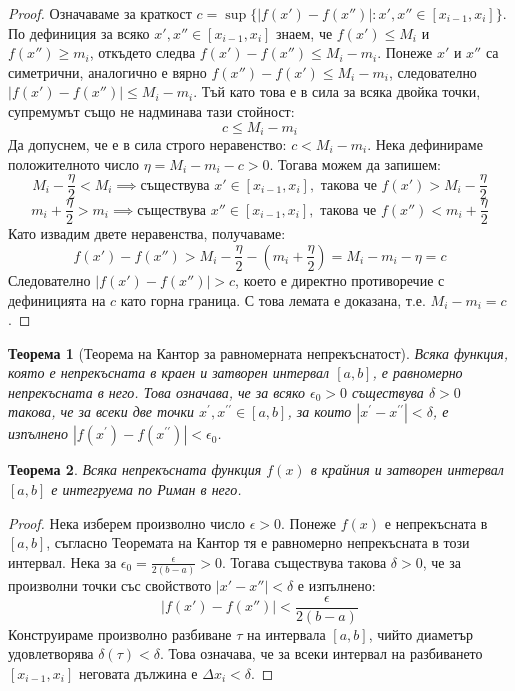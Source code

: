 \documentclass{scrartcl}
\newtheorem{theorem}{Теорема}
\begin{document}
\begin{FlushLeft}
\begin{proof}
Означаваме за краткост $c = \sup \{ |f(x') - f(x'')| : x', x'' \in [x_{i-1}, x_i] \}$.
По дефиниция за всяко $x', x'' \in [x_{i-1}, x_i]$ знаем, че $f(x') \le M_i$ и $f(x'') \ge m_i$, откъдето следва $f(x') - f(x'') \le M_i - m_i$. Понеже $x'$ и $x''$ са симетрични, аналогично е вярно $f(x'') - f(x') \le M_i - m_i$, следователно $|f(x') - f(x'')| \le M_i - m_i$. Тъй като това е в сила за всяка двойка точки, супремумът също не надминава тази стойност:
\[ c \le M_i - m_i \]
Да допуснем, че е в сила строго неравенство: $c < M_i - m_i$.
Нека дефинираме положителното число $\eta = M_i - m_i - c > 0$. Тогава можем да запишем:
\[ M_i - \frac{\eta}{2} < M_i \implies \text{съществува } x' \in [x_{i-1}, x_i], \text{ такова че } f(x') > M_i - \frac{\eta}{2} \]
\[ m_i + \frac{\eta}{2} > m_i \implies \text{съществува } x'' \in [x_{i-1}, x_i], \text{ такова че } f(x'') < m_i + \frac{\eta}{2} \]
Като извадим двете неравенства, получаваме:
\[ f(x') - f(x'') > M_i - \frac{\eta}{2} - \left(m_i + \frac{\eta}{2}\right) = M_i - m_i - \eta = c \]
Следователно $|f(x') - f(x'')| > c$, което е директно противоречие с дефиницията на $c$ като горна граница. С това лемата е доказана, т.е. $M_i - m_i = c$.
\end{proof}

\begin{theorem}[Теорема на Кантор за равномерната непрекъснатост]
Всяка функция, която е непрекъсната в краен и затворен интервал $[a, b]$, е равномерно непрекъсната в него. Това означава, че за всяко $\epsilon_0 > 0$ съществува $\delta > 0$ такова, че за всеки две точки $x^{\prime}, x^{\prime\prime} \in [a, b]$, за които $|x^{\prime} - x^{\prime\prime}| < \delta$, е изпълнено $|f(x^{\prime}) - f(x^{\prime\prime})| < \epsilon_0$.
\end{theorem}

\begin{theorem}
Всяка непрекъсната функция $f(x)$ в крайния и затворен интервал $[a, b]$ е интегруема по Риман в него.
\end{theorem}

\begin{proof}
Нека изберем произволно число $\epsilon > 0$. Понеже $f(x)$ е непрекъсната в $[a, b]$, съгласно Теоремата на Кантор тя е равномерно непрекъсната в този интервал. Нека за $\epsilon_0 = \frac{\epsilon}{2(b-a)} > 0$. Тогава съществува такова $\delta > 0$, че за произволни точки със свойството $|x' - x''| < \delta$ е изпълнено:
\[ |f(x') - f(x'')| < \frac{\epsilon}{2(b-a)} \]
Конструираме произволно разбиване $\tau$ на интервала $[a, b]$, чийто диаметър удовлетворява $\delta(\tau) < \delta$. Това означава, че за всеки интервал на разбиването $[x_{i-1}, x_i]$ неговата дължина е $\Delta x_i < \delta$. 


\end{proof}
\end{FlushLeft}
\end{document}
